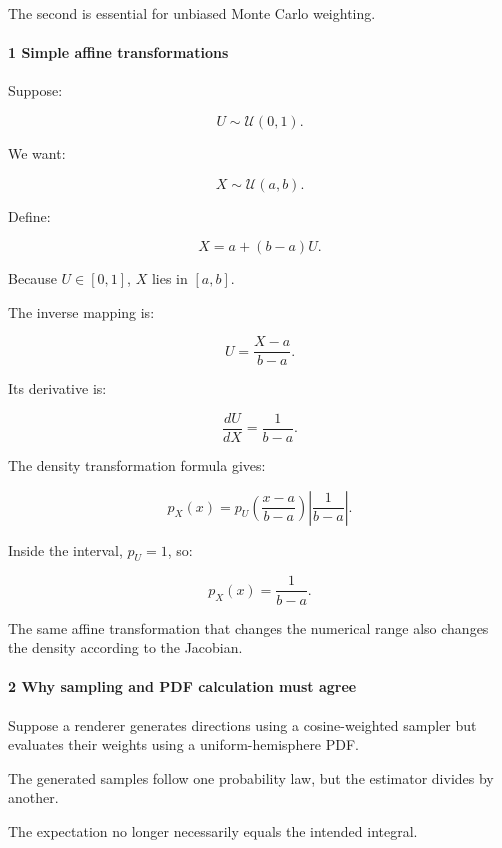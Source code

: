 The second is essential for unbiased Monte Carlo weighting.

\paragraph{1 Simple affine transformations}\label{02-foundations-ii-ch029-simple-affine-transformations}

\hypertarget{02-foundations-ii-ch029-simple-affine-transformations}{}

Suppose:

\[
 U\sim\mathcal U(0,1).
\]

We want:

\[
 X\sim\mathcal U(a,b).
\]

Define:

\[
 \boxed{X=a+(b-a)U}.
\]

Because \(U\in[0,1]\), \(X\) lies in \([a,b]\).

The inverse mapping is:

\[
 U=\frac{X-a}{b-a}.
\]

Its derivative is:

\[
 \frac{dU}{dX}=\frac1{b-a}.
\]

The density transformation formula gives:

\[
 p_X(x)= p_U\left(\frac{x-a}{b-a}\right) \left|\frac1{b-a}\right|.
\]

Inside the interval, \(p_U=1\), so:

\[
 \boxed{p_X(x)=\frac1{b-a}}.
\]

The same affine transformation that changes the numerical range also changes the density according to the Jacobian.

\paragraph{2 Why sampling and PDF calculation must agree}\label{02-foundations-ii-ch029-why-sampling-and-pdf-calculation-must-agree}

\hypertarget{02-foundations-ii-ch029-why-sampling-and-pdf-calculation-must-agree}{}

Suppose a renderer generates directions using a cosine-weighted sampler but evaluates their weights using a uniform-hemisphere PDF.

The generated samples follow one probability law, but the estimator divides by another.

The expectation no longer necessarily equals the intended integral.

